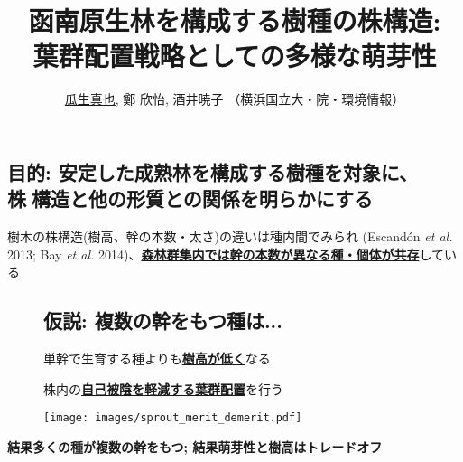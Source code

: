 \documentclass[a0, 30pt, plainboxedsections]{sciposter} %
\title{\textcolor{Blue1}{函南原生林を構成する樹種の株構造:\\\vspace{-0.2em} 葉群配置戦略としての多様な萌芽性}}
\author{\underline{瓜生真也}, 鄭 欣怡, 酒井暁子 （横浜国立大・院・環境情報） \normalsize{\faEnvelope \hspace{0.02em} \fontspec{HelveticaNeue-Italic}{suika1127@gmail.com}}}
\begin{document}
\maketitle
\vspace{-2em}
\begin{multicols}{2}
\begin{mdframed}[style=section.frame]
  \centering\LARGE\textbf{\color{white}{はじめに}}
\end{mdframed}

\vspace{-0.6em}\subsection*{目的: 安定した成熟林を構成する樹種を対象に、\\\hspace*{10em}株構造と他の形質との関係を明らかにする}

樹木の株構造(樹高、幹の本数・太さ)の違いは種内間でみられ {\footnotesize(Escandón \textit{et al.} 2013; Bay \textit{et al.} 2014)}、\textbf{\underline{森林群集内では幹の本数が異なる種・個体が共存}}している

\vspace{-0.6em}\begin{figure}
 \begin{minipage}{0.6\hsize}
 \subsection*{仮説: 複数の幹をもつ種は...}
   単幹で生育する種よりも\underline{\textbf{樹高が低く}}なる
  
   株内の\underline{\textbf{自己被陰を軽減する葉群配置}}を行う
 \end{minipage}
 \begin{minipage}{0.4\hsize}
  \centering
   \texttt{[image: images/sprout\_merit\_demerit.pdf]}  
 \end{minipage}
\end{figure}

\columnbreak
\begin{mdframed}[style=conclusion.frame,frametitle={\textbf{\Large{\faFlagAlt \vspace{0.02em} 結論: {萌芽性は樹高と背反的に進化しており、\\\hspace*{2.8em}群集の中に多様な萌芽性をもつ種が存在する}}}}]
  \vspace{0.4em}
  \flushleft
  \normalsize{
  \textbf{結果多くの種が複数の幹をもつ; 結果萌芽性と樹高はトレードオフ}
  
}
\end{mdframed}
\end{multicols}
\end{document}
